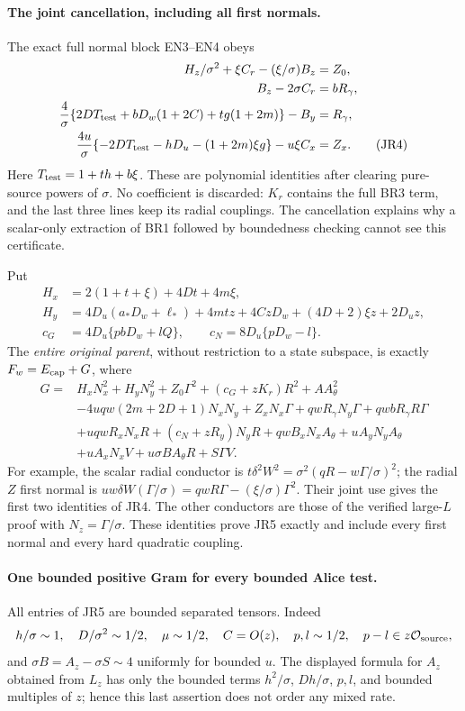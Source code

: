 \paragraph{The joint cancellation, including all first normals.}
The exact full normal block EN3--EN4 obeys
\begin{align*}
 H_z/\sigma^2+\xi C_r-(\xi/\sigma)B_z&=Z_0,\\
 B_z-2\sigma C_r&=bR_\gamma,\\
 \frac4\sigma\{2DT_{\rm test}+bD_w(1+2C)+tg(1+2m)\}-B_y&=R_\gamma,\\
 \frac{4u}{\sigma}\{-2DT_{\rm test}-hD_u-(1+2m)\xi g\}
                         -u\xi C_x&=Z_x.
\tag{JR4}
\end{align*}
Here $T_{\rm test}=1+th+b\xi$. These are polynomial identities after clearing
pure-source powers of $\sigma$. No coefficient is discarded: $K_r$
contains the full BR3 term, and the last three lines keep its radial
couplings. The cancellation explains why a scalar-only extraction of
BR1 followed by boundedness checking cannot see this certificate.

Put
\begin{align*}
 H_x&=2(1+t+\xi)+4Dt+4m\xi,\\
 H_y&=4D_u(a_*D_w+\ell_*)+4mtz+4CzD_w+(4D+2)\xi z+2D_uz,\\
 c_G&=4D_u\{pbD_w+lQ\},\qquad
 c_N=8D_u\{pD_w-l\}.
\end{align*}
The \emph{entire original parent}, without restriction to a state
subspace, is exactly $F_w=E_{\rm cap}+G$, where
\begin{align*}
 G={}&H_xN_x^2+H_yN_y^2+Z_0\Gamma^2
        +(c_G+zK_r)R^2+AA_\theta^2\\
 &-4uqw(2m+2D+1)N_xN_y+Z_xN_x\Gamma
       +qwR_\gamma N_y\Gamma+qwbR_\gamma R\Gamma\\
 &+uqwR_xN_xR+(c_N+zR_y)N_yR
       +qwB_xN_xA_\theta+uA_yN_yA_\theta\\
 &+uA_xN_xV+u\sigma B A_\theta R+S\Gamma V.
\tag{JR5}
\end{align*}
For example, the scalar radial conductor is
$t\delta^2W^2=\sigma^2(qR-w\Gamma/\sigma)^2$;
the radial $Z$ first normal is
$uw\delta W(\Gamma/\sigma)=qwR\Gamma-(\xi/\sigma)\Gamma^2$.
Their joint use gives the first two identities of JR4. The other
conductors are those of the verified large-$L$ proof with
$N_z=\Gamma/\sigma$. These identities prove JR5 exactly and include
every first normal and every hard quadratic coupling.

\paragraph{One bounded positive Gram for every bounded Alice test.}
All entries of JR5 are bounded separated tensors. Indeed
\[
 h/\sigma\sim1,\quad D/\sigma^2\sim1/2,\quad
 \mu\sim1/2,\quad C=O(z),\quad p,l\sim1/2,
 \quad p-l\in z\mathcal O_{\rm source},
\]
and $\sigma B=A_z-\sigma S\sim4$ uniformly for bounded $u$.
The displayed formula for $A_z$ obtained from $L_z$ has only the
bounded terms $h^2/\sigma$, $Dh/\sigma$, $p,l$, and bounded multiples
of $z$; hence this last assertion does not order any mixed rate.

